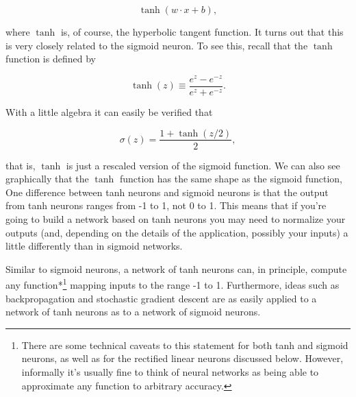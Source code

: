 \begin{equation}
\tanh(w \cdot x+b),
\tag{109}
\end{equation}

\noindent where $\tanh$ is, of course, the hyperbolic tangent function. It turns out that this is very closely related to the sigmoid neuron. To see this, recall that the $\tanh$ function is defined by

\begin{equation}
\tanh(z) \equiv \frac{e^z-e^{-z}}{e^z+e^{-z}}.
\tag{110}
\end{equation}

\noindent With a little algebra it can easily be verified that

\begin{equation}
\sigma(z) = \frac{1+\tanh(z/2)}{2},
\tag{111}
\end{equation}

\noindent that is, $\tanh$ is just a rescaled version of the sigmoid function. We can also see graphically that the $\tanh$ function has the same shape as the sigmoid function, One difference between tanh neurons and sigmoid neurons is that the output from tanh neurons ranges from -1 to 1, not 0 to 1. This means that if you're going to build a network based on tanh neurons you may need to normalize your outputs (and, depending on the details of the application, possibly your inputs) a little differently than in sigmoid networks.


Similar to sigmoid neurons, a network of tanh neurons can, in principle, compute any function*\footnote{There are some technical caveats to this statement for both tanh and sigmoid neurons, as well as for the rectified linear neurons discussed below. However, informally it's usually fine to think of neural networks as being able to approximate any function to arbitrary accuracy.} mapping inputs to the range -1 to 1. Furthermore, ideas such as backpropagation and stochastic gradient descent are as easily applied to a network of tanh neurons as to a network of sigmoid neurons.



